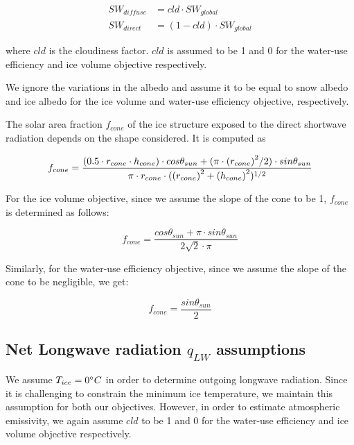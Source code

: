 \begin{equation}
\begin{split}
  SW_{diffuse} &= cld \cdot SW_{global}\\
  SW_{direct} &= (1-cld) \cdot SW_{global}
\end{split}
\end{equation}

where $cld$ is the cloudiness factor. $cld$ is assumed to be 1 and 0 for the water-use efficiency and ice volume
objective respectively.

We ignore the variations in the albedo and assume it to be equal to snow albedo and ice albedo for the  ice
volume and water-use efficiency objective, respectively.

The solar area fraction $f_{cone}$ of the ice structure exposed to the direct shortwave radiation depends on the
shape considered. It is computed as

\begin{equation}
		f_{cone} =\frac{(0.5 \cdot r_{cone} \cdot h_{cone}) \cdot cos \theta_{sun} +(\pi \cdot
			{(r_{cone})}^2/2) \cdot sin \theta_{sun} }{\pi \cdot r_{cone} \cdot ({(r_{cone})}^2+{(h_{cone})}^2)^{1/2}}\\
\end{equation}

For the ice volume objective, since we assume the slope of the cone to be 1, $f_{cone}$ is determined as follows:

\begin{equation}
		f_{cone} =\frac{ cos \theta_{sun} + \pi \cdot sin \theta_{sun} }{2\sqrt{2} \cdot \pi }
\end{equation}

Similarly, for the water-use efficiency objective, since we assume the slope of the cone to be negligible, we get:

\begin{equation}
		f_{cone} =\frac{ sin \theta_{sun} }{2 }
\end{equation}

\subsection{Net Longwave radiation \texorpdfstring{$q_{LW}$}{Lg} assumptions} 

We assume $T_{ice} = 0 ^{\circ} C$ in order to determine outgoing longwave radiation. Since it is challenging to
constrain the minimum ice temperature, we maintain this assumption for both our objectives. However, in order to
estimate atmospheric emissivity, we again assume $cld$ to be 1 and 0 for the water-use efficiency and ice volume
objective respectively.

